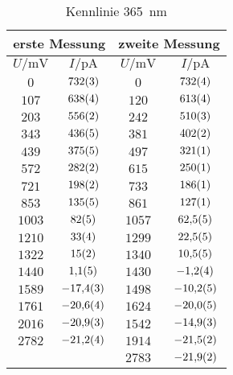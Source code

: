 \begin{table}[H]
   \centering
\caption{Kennlinie \SI{365}{nm}}
\begin{tabular}{cc||cc}
\hline\multicolumn{2}{c||}{erste Messung} & \multicolumn{2}{c}{zweite Messung}\\

\hline
$U / \unit{\milli\volt}$ & $I / \unit{\pico\ampere}$ & $U / \unit{\milli\volt}$ & $I / \unit{\pico\ampere}$ \\ 
\hline
$\num{0}$ & $\num{732\pm 3}$ & $\num{0}$ & $\num{732\pm 4}$ \\
$\num{107}$ & $\num{638\pm 4}$ & $\num{120}$ & $\num{613\pm 4}$ \\
$\num{203}$ & $\num{556\pm 2}$ & $\num{242}$ & $\num{510\pm 3}$ \\
$\num{343}$ & $\num{436\pm 5}$ & $\num{381}$ & $\num{402\pm 2}$ \\
$\num{439}$ & $\num{375\pm 5}$ & $\num{497}$ & $\num{321\pm 1}$ \\
$\num{572}$ & $\num{282\pm 2}$ & $\num{615}$ & $\num{250\pm 1}$ \\
$\num{721}$ & $\num{198\pm 2}$ & $\num{733}$ & $\num{186\pm 1}$ \\
$\num{853}$ & $\num{135\pm 5}$ & $\num{861}$ & $\num{127\pm 1}$ \\
$\num{1003}$ & $\num{82\pm 5}$ & $\num{1057}$ & $\num{62.5\pm 0.5}$ \\
$\num{1210}$ & $\num{33\pm 4}$ & $\num{1299}$ & $\num{22.5\pm 0.5}$ \\
$\num{1322}$ & $\num{15\pm 2}$ & $\num{1340}$ & $\num{10.5\pm 0.5}$ \\
$\num{1440}$ & $\num{1.1\pm 0.5}$ & $\num{1430}$ & $\num{-1.2\pm 0.4}$ \\
$\num{1589}$ & $\num{-17.4\pm 0.3}$ & $\num{1498}$ & $\num{-10.2\pm 0.5}$ \\
$\num{1761}$ & $\num{-20.6\pm 0.4}$ & $\num{1624}$ & $\num{-20.0\pm 0.5}$ \\
$\num{2016}$ & $\num{-20.9\pm 0.3}$ & $\num{1542}$ & $\num{-14.9\pm 0.3}$ \\
$\num{2782}$ & $\num{-21.2\pm 0.4}$ & $\num{1914}$ & $\num{-21.5\pm 0.2}$ \\
   &    & $\num{2783}$ & $\num{-21.9\pm 0.2}$ \\
\hline\end{tabular}
\label{kennlinie_365nm}
\end{table}